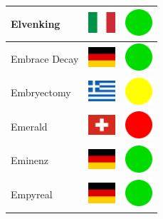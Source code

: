 \documentclass[12pt, a4paper, twoside]{report}
\begin{document}
\begin{center}
\begin{longtable}{|p{5cm}|p{2cm}|p{2cm}|}
Elvenking & \includegraphics[width=1cm]{4x3/it} & \includegraphics[width=1cm]{likes/y} \\ \hline
Embrace Decay & \includegraphics[width=1cm]{4x3/de} & \includegraphics[width=1cm]{likes/y} \\ \hline
Embryectomy & \includegraphics[width=1cm]{4x3/gr} & \includegraphics[width=1cm]{likes/m} \\ \hline
Emerald & \includegraphics[width=1cm]{4x3/ch} & \includegraphics[width=1cm]{likes/n} \\ \hline
Eminenz & \includegraphics[width=1cm]{4x3/de} & \includegraphics[width=1cm]{likes/y} \\ \hline
Empyreal & \includegraphics[width=1cm]{4x3/de} & \includegraphics[width=1cm]{likes/y} \\ \hline

\end{longtable}
\end{center}
\end{document}
